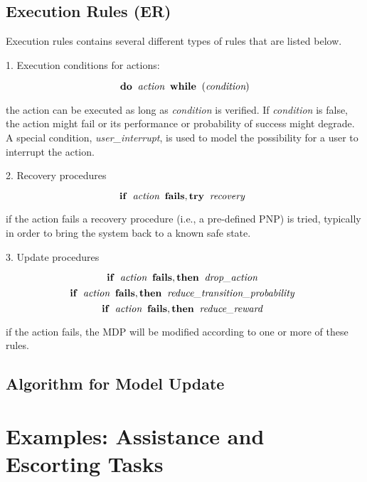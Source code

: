 


\subsection{Execution Rules (ER)}

Execution rules contains several different types of rules that are listed below.

\vspace{0.5cm}

1. Execution conditions for actions:

\[ \mathbf{do} \;\; \emph{action} \;\; \mathbf{while} \;\; ( \emph{condition} ) \]

\noindent
the action can be executed as long as \emph{condition} is verified.
If \emph{condition} is false, the action might fail or its performance or probability of success might degrade.
A special condition, \emph{user\_interrupt}, is used to model the possibility for a user to interrupt the action.

\vspace{0.5cm}

2. Recovery procedures

\[ \mathbf{if} \;\; \emph{action} \;\; \mathbf{fails, try} \;\; \emph{recovery} \;\; \]

\noindent
if the action fails a recovery procedure (i.e., a pre-defined PNP) is tried, typically in order to bring the system back to a known safe state.


\vspace{0.5cm}

3. Update procedures

\[ \mathbf{if} \;\; \emph{action} \;\; \mathbf{fails, then} \;\; \emph{drop\_action} \;\; \]
\[ \mathbf{if} \;\; \emph{action} \;\; \mathbf{fails, then} \;\; \emph{reduce\_transition\_probability} \;\; \]
\[ \mathbf{if} \;\; \emph{action} \;\; \mathbf{fails, then} \;\; \emph{reduce\_reward} \;\; \]



\noindent
if the action fails, the MDP will be modified according to one or more of these rules.






\subsection{Algorithm for Model Update}


\section{Examples: Assistance and Escorting Tasks}



